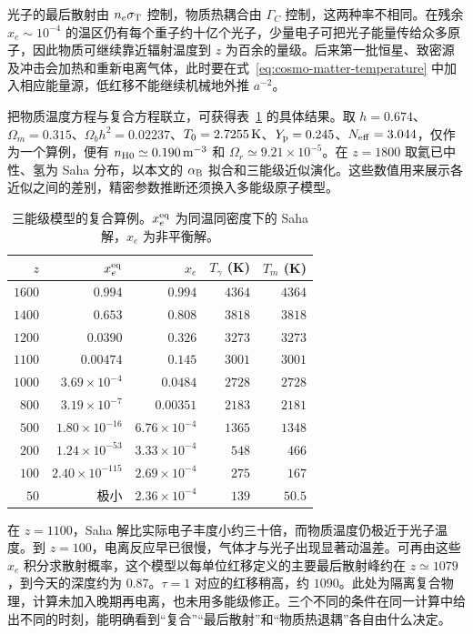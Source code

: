 光子的最后散射由 $n_e\sigma_{\rm T}$ 控制，物质热耦合由 $\Gamma_C$ 控制，这两种率不相同。在残余 $x_e\sim10^{-4}$ 的温区仍有每个重子约十亿个光子，少量电子可把光子能量传给众多原子，因此物质可继续靠近辐射温度到 $z$ 为百余的量级。后来第一批恒星、致密源及冲击会加热和重新电离气体，此时要在式~\eqref{eq:cosmo-matter-temperature} 中加入相应能量源，低红移不能继续机械地外推 $a^{-2}$。

把物质温度方程与复合方程联立，可获得表~\ref{tab:cosmo-recomb-example} 的具体结果。取 $h=0.674$、$\Omega_m=0.315$、$\Omega_bh^2=0.02237$、$T_0=2.7255\,{\rm K}$、$Y_{\rm p}=0.245$、$N_{\rm eff}=3.044$，仅作为一个算例，便有 $n_{{\rm H}0}\simeq0.190\,{\rm m}^{-3}$ 和 $\Omega_r\simeq9.21\times10^{-5}$。在 $z=1800$ 取氦已中性、氢为 Saha 分布，以本文的 $\alpha_{\rm B}$ 拟合和三能级近似演化。这些数值用来展示各近似之间的差别，精密参数推断还须换入多能级原子模型。

\begin{table}[htbp]
\centering\small
\caption{三能级模型的复合算例。$x_e^{\rm eq}$ 为同温同密度下的 Saha 解，$x_e$ 为非平衡解。}\label{tab:cosmo-recomb-example}
\begin{tabular}{@{}rrrrr@{}}\toprule
$z$ & $x_e^{\rm eq}$ & $x_e$ & $T_\gamma$ (K) & $T_m$ (K) \\ \midrule
$1600$ & $0.994$ & $0.994$ & $4364$ & $4364$ \\
$1400$ & $0.653$ & $0.808$ & $3818$ & $3818$ \\
$1200$ & $0.0390$ & $0.326$ & $3273$ & $3273$ \\
$1100$ & $0.00474$ & $0.145$ & $3001$ & $3001$ \\
$1000$ & $3.69\times10^{-4}$ & $0.0484$ & $2728$ & $2728$ \\
$800$ & $3.19\times10^{-7}$ & $0.00351$ & $2183$ & $2181$ \\
$500$ & $1.80\times10^{-16}$ & $6.76\times10^{-4}$ & $1365$ & $1348$ \\
$200$ & $1.24\times10^{-53}$ & $3.33\times10^{-4}$ & $548$ & $466$ \\
$100$ & $2.40\times10^{-115}$ & $2.69\times10^{-4}$ & $275$ & $167$ \\
$50$ & 极小 & $2.36\times10^{-4}$ & $139$ & $50.5$ \\ \bottomrule
\end{tabular}
\end{table}

在 $z=1100$，Saha 解比实际电子丰度小约三十倍，而物质温度仍极近于光子温度。到 $z=100$，电离反应早已很慢，气体才与光子出现显著动温差。可再由这些 $x_e$ 积分求散射概率，这个模型以每单位红移定义的主要最后散射峰约在 $z\simeq1079$，到今天的深度约为 $0.87$。$\tau=1$ 对应的红移稍高，约 $1090$。此处为隔离复合物理，计算未加入晚期再电离，也未用多能级修正。三个不同的条件在同一计算中给出不同的时刻，能明确看到“复合”“最后散射”和“物质热退耦”各自由什么决定。

